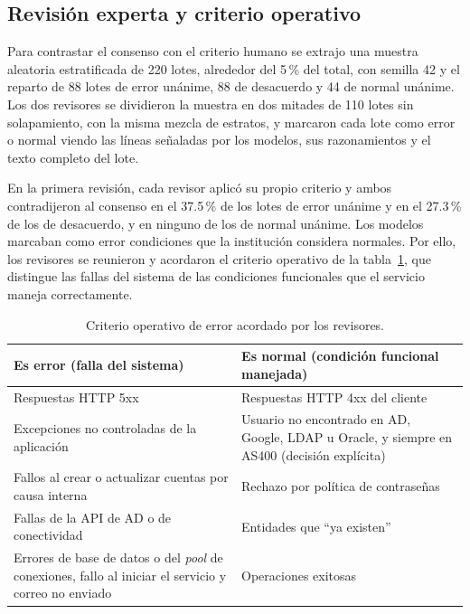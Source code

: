 \subsection{Revisión experta y criterio operativo}\label{subsec:met_expertos}\label{sec:met_criterio}

Para contrastar el consenso con el criterio humano se extrajo una muestra aleatoria estratificada de 220 lotes, alrededor del 5\,\% del total, con semilla 42 y el reparto de 88 lotes de error unánime, 88 de desacuerdo y 44 de normal unánime. Los dos revisores se dividieron la muestra en dos mitades de 110 lotes sin solapamiento, con la misma mezcla de estratos, y marcaron cada lote como error o normal viendo las líneas señaladas por los modelos, sus razonamientos y el texto completo del lote.

En la primera revisión, cada revisor aplicó su propio criterio y ambos contradijeron al consenso en el 37.5\,\% de los lotes de error unánime y en el 27.3\,\% de los de desacuerdo, y en ninguno de los de normal unánime. Los modelos marcaban como error condiciones que la institución considera normales. Por ello, los revisores se reunieron y acordaron el criterio operativo de la tabla~\ref{tab:met_criterio}, que distingue las fallas del sistema de las condiciones funcionales que el servicio maneja correctamente.

\begin{table}[H]
\centering
\caption{Criterio operativo de error acordado por los revisores.}
\label{tab:met_criterio}
\small
\begin{tabular}{@{}p{7.2cm}p{7.2cm}@{}}
\toprule
\textbf{Es error (falla del sistema)} & \textbf{Es normal (condición funcional manejada)} \\
\midrule
Respuestas HTTP 5xx & Respuestas HTTP 4xx del cliente \\
Excepciones no controladas de la aplicación & Usuario no encontrado en AD, Google, LDAP u Oracle, y siempre en AS400 (decisión explícita) \\
Fallos al crear o actualizar cuentas por causa interna & Rechazo por política de contraseñas \\
Fallas de la API de AD o de conectividad & Entidades que ``ya existen'' \\
Errores de base de datos o del \textit{pool} de conexiones, fallo al iniciar el servicio y correo no enviado & Operaciones exitosas \\
\bottomrule
\end{tabular}
\normalsize
\end{table}

